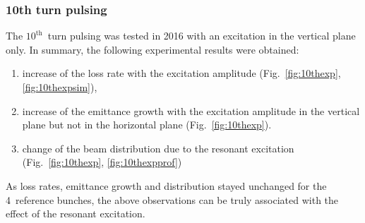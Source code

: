 \documentclass[%
 reprint,
 amsmath,amssymb,
 aps,
prstab,
]{revtex4-1}
\begin{document}
\subsubsection{10th turn pulsing\label{sec:simex10}}
The $10^{\mathrm{th}}$~turn pulsing was tested in 2016 with an excitation in the vertical plane only. In summary, the following experimental results were obtained:
\begin{enumerate}
	\item increase of the loss rate with the excitation amplitude (Fig.~\ref{fig:10thexp}, \ref{fig:10thexpsim}),
	\item increase of the emittance growth with the excitation amplitude in the vertical plane but not in the horizontal plane (Fig.~\ref{fig:10thexp}).
	\item change of the beam distribution due to the resonant excitation (Fig.~\ref{fig:10thexp}, \ref{fig:10thexpprof})
\end{enumerate}
As loss rates, emittance growth and distribution stayed unchanged for the 4~reference bunches, the above observations can be truly associated with the effect of the resonant excitation.
\end{document}
